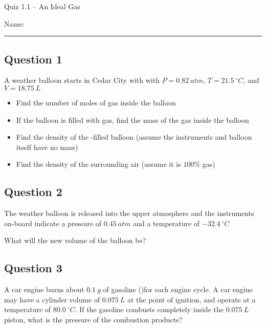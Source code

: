 \documentclass[11pt, letterpaper]{memoir}
\begin{document}
	\begin{center}
		{\large Quiz 1.1 --	An Ideal Gas}
	\end{center}
	{\large Name: \rule[-1mm]{4in}{.1pt} 

\subsection*{Question 1}
A weather balloon starts in Cedar City with with $P=0.82~atm$, $T=21.5~^\circ C$, and $V=18.75~L$

\begin{itemize}
	\item Find the number of moles of gas inside the balloon
	
	\vspace{2em}
	\item If the balloon is filled with  gas, find the mass of the gas inside the balloon
	
	\vspace{2em}
	\item Find the density of the -filled balloon (assume the instruments and balloon itself have no mass)
	
	\vspace{2em}
	\item Find the density of the surrounding air (assume it is $100\%$  gas)
\end{itemize}
	
\vspace{2em}
\subsection*{Question 2}
The weather balloon is released into the upper atmosphere and the instruments on-board indicate a pressure of $0.45~atm$ and a temperature of $-32.4~^\circ C$

\noindent What will the new volume of the balloon be?

\vspace{4em}
\subsection*{Question 3}
A car engine burns about $0.1~g$ of gasoline ()for each engine cycle. A car engine may have a cylinder volume of $0.075~L$ at the point of ignition, and operate at a temperature of $80.0~^\circ C$. If the gasoline combusts completely inside the $0.075~L$ piston, what is the pressure of the combustion products?

}
\end{document}
